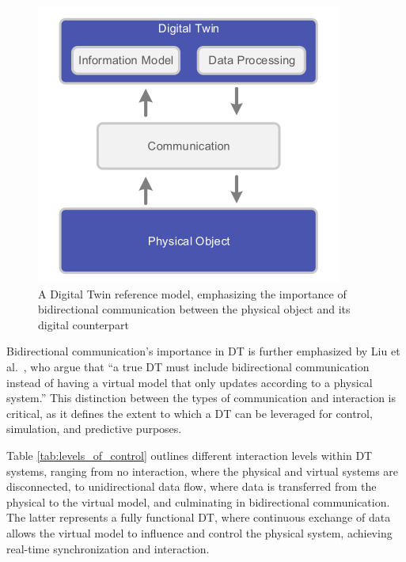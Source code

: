 \begin{figure}[!htpb]
    \centering
    \includegraphics[width=0.55\linewidth]{figs/dt_reference_model.png}
    \caption{A Digital Twin reference model, emphasizing the importance of bidirectional communication between the physical object and its digital counterpart~\cite{dt_model}}
    \label{f:dt-structure}
\end{figure}

Bidirectional communication's importance in \ac{DT} is further emphasized by Liu et al.~\cite{liu2022state}, who argue that “a true DT must include bidirectional communication instead of having a virtual model that only updates according to a physical system.” This distinction between the types of communication and interaction is critical, as it defines the extent to which a \ac{DT} can be leveraged for control, simulation, and predictive purposes.

Table \ref{tab:levels_of_control} outlines different interaction levels within \ac{DT} systems, ranging from no interaction, where the physical and virtual systems are disconnected, to unidirectional data flow, where data is transferred from the physical to the virtual model, and culminating in bidirectional communication. The latter represents a fully functional \ac{DT}, where continuous exchange of data allows the virtual model to influence and control the physical system, achieving real-time synchronization and interaction.


